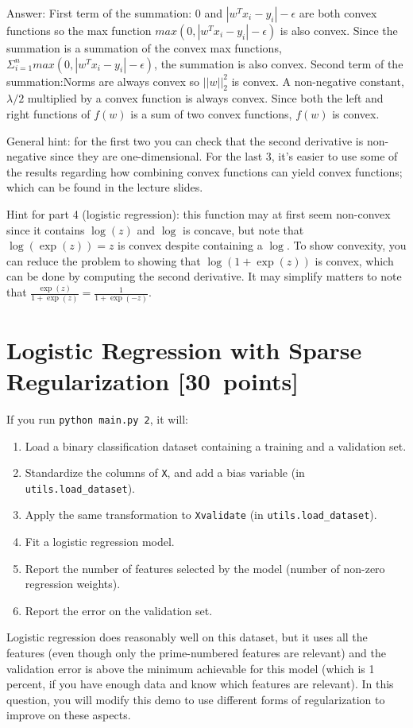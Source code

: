 \documentclass{article}
\newcommand{\gre}[1]{\textcolor{gre}{#1}}
\newcommand\ans[1]{\par\gre{Answer: #1}}
\newcommand\pts[1]{\textcolor{pointscolour}{[#1~points]}}
\begin{document}
\begin{enumerate}
\ans{First term of the summation: $0$ and $|w^Tx_i - y_i|-\epsilon$ are both convex functions so the max function $max(0,|w^Tx_i - y_i|-\epsilon)$ is also convex. Since the summation is a summation of the convex max functions, $\Sigma_{i=1}^n max(0,|w^Tx_i - y_i|-\epsilon)$, the summation is also convex. 
\newline \newline
Second term of the summation:Norms are always convex so $||w||_2^2$ is convex. A non-negative constant, $ \lambda / 2 $ multiplied by a convex function is always convex. 
\newline \newline
Since both the left and right functions of $f(w)$ is a sum of two convex functions, $f(w)$ is convex.}
\end{enumerate}

General hint: for the first two you can check that the second derivative is non-negative since they are one-dimensional. For the last 3, it's easier to use some of the results regarding how combining convex functions can yield convex functions; which can be found in the lecture slides.

Hint for part 4 (logistic regression): this function may at first seem non-convex since it contains $\log(z)$ and $\log$ is concave, but note that $\log(\exp(z))=z$ is convex despite containing a $\log$. To show convexity, you can reduce the problem to showing that $\log(1+\exp(z))$ is convex, which can be done by computing the second derivative. It may simplify matters to note that $\frac{\exp(z)}{1+\exp(z)} = \frac{1}{1+\exp(-z)}$.


\clearpage
\section{Logistic Regression with Sparse Regularization \pts{30}}

If you run  \verb|python main.py 2|, it will:
\begin{enumerate}
\item Load a binary classification dataset containing a training and a validation set.
\item Standardize the columns of \verb|X|, and add a bias variable (in \verb|utils.load_dataset|).
\item Apply the same transformation to \verb|Xvalidate| (in \verb|utils.load_dataset|).
\item Fit a logistic regression model.
\item Report the number of features selected by the model (number of non-zero regression weights).
\item Report the error on the validation set.
\end{enumerate}
Logistic regression does reasonably well on this dataset,
but it uses all the features (even though only the prime-numbered features are relevant)
and the validation error is above the minimum achievable for this model
(which is 1 percent, if you have enough data and know which features are relevant).
In this question, you will modify this demo to use different forms of regularization
 to improve on these aspects.
\end{document}
